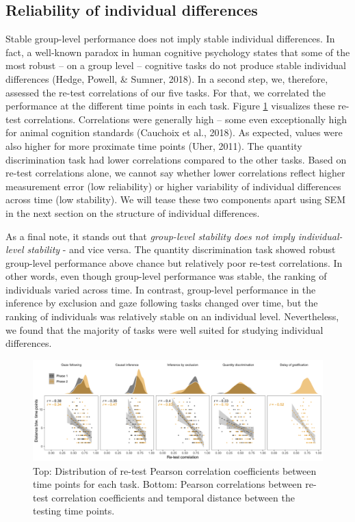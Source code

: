 \documentclass[
  man,floatsintext]{apa6}
\begin{document}
\hypertarget{reliability-of-individual-differences}{%
\subsection{Reliability of individual differences}\label{reliability-of-individual-differences}}

Stable group-level performance does not imply stable individual differences. In fact, a well-known paradox in human cognitive psychology states that some of the most robust -- on a group level -- cognitive tasks do not produce stable individual differences (Hedge, Powell, \& Sumner, 2018). In a second step, we, therefore, assessed the re-test correlations of our five tasks. For that, we correlated the performance at the different time points in each task. Figure \ref{fig:relplot} visualizes these re-test correlations. Correlations were generally high -- some even exceptionally high for animal cognition standards (Cauchoix et al., 2018). As expected, values were also higher for more proximate time points (Uher, 2011). The quantity discrimination task had lower correlations compared to the other tasks. Based on re-test correlations alone, we cannot say whether lower correlations reflect higher measurement error (low reliability) or higher variability of individual differences across time (low stability). We will tease these two components apart using SEM in the next section on the structure of individual differences.

As a final note, it stands out that \emph{group-level stability does not imply individual-level stability} - and vice versa. The quantity discrimination task showed robust group-level performance above chance but relatively poor re-test correlations. In other words, even though group-level performance was stable, the ranking of individuals varied across time. In contrast, group-level performance in the inference by exclusion and gaze following tasks changed over time, but the ranking of individuals was relatively stable on an individual level. Nevertheless, we found that the majority of tasks were well suited for studying individual differences.

\begin{figure}
\includegraphics[width=1\linewidth]{./figures/reliability} \caption{Top: Distribution of re-test Pearson correlation coefficients between time points for each task. Bottom: Pearson correlations between re-test correlation coefficients and temporal distance between the testing time points.}\label{fig:relplot}
\end{figure}
\end{document}
